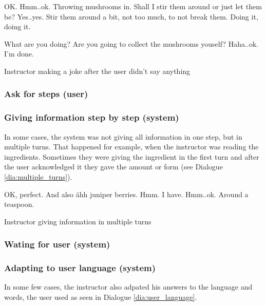 \documentclass[
	11pt, %
]{fphw}
\newenvironment{captionedDialogue}
    {\captionsetup{
        type=Dialogue,
        skip=2pt,
        belowskip=15pt
        }
    }
    {}
\newenvironment{mydialogue}
    {\begin{snugshade}
     \hrulefill
     \begin{dialogue}}
    {\end{dialogue}
     \hrulefill
     \end{snugshade}}
\begin{document}
\begin{captionedDialogue}
    \begin{mydialogue}
         OK. Hmm..ok. Throwing mushrooms in. Shall I stir them around or just let them be? 
         Yes..yes. Stir them around a bit, not too much, to not break them. 
         Doing it, doing it. 
        
        \medskip
        \medskip

         What are you doing? Are you going to collect the mushrooms youself?
         Haha..ok. I'm done.
    \end{mydialogue}
    \caption{Instructor making a joke after the user didn't say anything}
    \label{dia:joke}
\end{captionedDialogue}

\subsubsection*{Ask for steps (user)}


\subsubsection*{Giving information step by step (system)}
In some cases, the system was not giving all information in one step, but in multiple turns. That happened for example, when the instructor was reading the ingredients. Sometimes they were giving the ingredient in the first turn and after the user acknowledged it they gave the amount or form (see Dialogue \ref{dia:multiple_turns}).

\begin{captionedDialogue}
    \begin{mydialogue}
         OK, perfect. And also ähh juniper berries. 
         Hmm. I have.
         Hmm..ok. Around a teaspoon.
    \end{mydialogue}
    \caption{Instructor giving information in multiple turns}
    \label{dia:multiple_turns}
\end{captionedDialogue}

\subsubsection*{Wating for user (system)}


\subsubsection*{Adapting to user language (system)}
In some few cases, the instructor also adpated his answers to the language and words, the user used as seen in Dialogue \ref{dia:user_language}.
\end{document}
